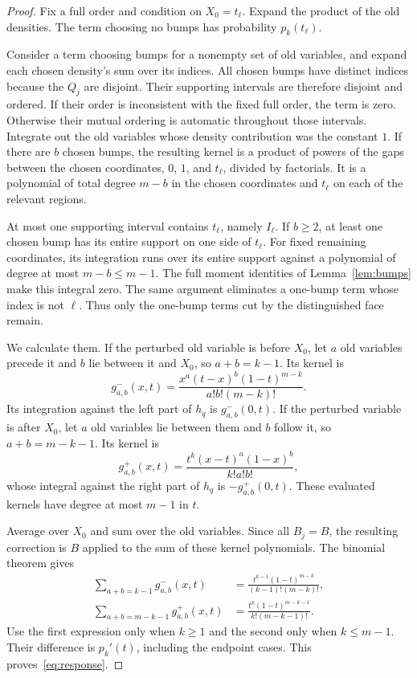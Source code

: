 \documentclass[11pt]{article}
\begin{document}
\begin{proof}
Fix a full order and condition on $X_0=t_\ell$. Expand the product of
the old densities. The term choosing no bumps has probability
$p_k(t_\ell)$.

Consider a term choosing bumps for a nonempty set of old variables,
and expand each chosen density's sum over its indices. All chosen bumps
have distinct indices because the $Q_j$ are disjoint. Their supporting
intervals are therefore disjoint and ordered. If their order is inconsistent
with the fixed full order, the term is zero. Otherwise their mutual ordering
is automatic throughout those intervals. Integrate out the old variables
whose density contribution was the constant $1$. If there are $b$ chosen
bumps, the resulting kernel is a product of powers of the gaps between
the chosen coordinates, $0$, $1$, and $t_\ell$, divided by factorials.
It is a polynomial of total degree $m-b$ in the chosen coordinates and
$t_\ell$ on each of the relevant regions.

At most one supporting interval contains $t_\ell$, namely $I_\ell$.
If $b\ge2$, at least one chosen bump has its entire support on one side
of $t_\ell$. For fixed remaining coordinates, its integration runs over
its entire support against a polynomial of degree at most $m-b\le m-1$.
The full moment identities of Lemma~\ref{lem:bumps} make this integral
zero. The same argument eliminates a one-bump term whose index is not
$\ell$. Thus only the one-bump terms cut by the distinguished face remain.

We calculate them. If the perturbed old variable is before $X_0$, let
$a$ old variables precede it and $b$ lie between it and $X_0$, so
$a+b=k-1$. Its kernel is
\[
 g^-_{a,b}(x,t)=
 \frac{x^a(t-x)^b(1-t)^{m-k}}{a!b!(m-k)!}.
\]
Its integration against the left part of $h_q$ is $g^-_{a,b}(0,t)$.
If the perturbed variable is after $X_0$, let $a$ old variables lie
between them and $b$ follow it, so $a+b=m-k-1$. Its kernel is
\[
 g^+_{a,b}(x,t)=
 \frac{t^k(x-t)^a(1-x)^b}{k!a!b!},
\]
whose integral against the right part of $h_q$ is $-g^+_{a,b}(0,t)$.
These evaluated kernels have degree at most $m-1$ in $t$.

Average over $X_0$ and sum over the old variables. Since all $B_j=B$,
the resulting correction is $B$ applied to the sum of these kernel
polynomials. The binomial theorem gives
\begin{align*}
 \sum_{a+b=k-1}g^-_{a,b}(x,t)
  &=\frac{t^{k-1}(1-t)^{m-k}}{(k-1)!(m-k)!},\\
 \sum_{a+b=m-k-1}g^+_{a,b}(x,t)
  &=\frac{t^k(1-t)^{m-k-1}}{k!(m-k-1)!}.
\end{align*}
Use the first expression only when $k\ge1$ and the second only when
$k\le m-1$. Their difference is $p_k'(t)$, including the endpoint
cases. This proves~\eqref{eq:response}.
\end{proof}
\end{document}
